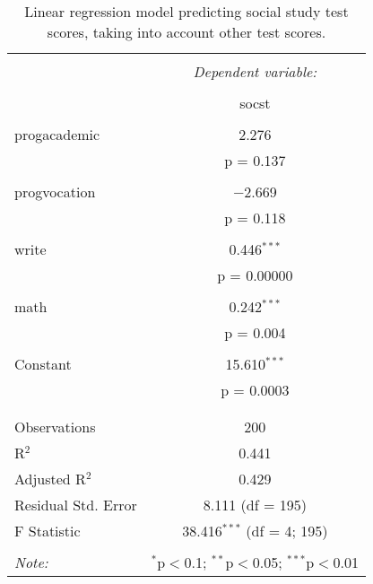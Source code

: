 
\begin{table}[!htbp] \centering 
  \caption{Linear regression model predicting social study test scores, taking into 
          account other test scores.} 
  \label{tab::lm_socst_peeking} 
\begin{tabular}{@{\extracolsep{5pt}}lc} 
\\[-1.8ex]\hline 
\hline \\[-1.8ex] 
 & \multicolumn{1}{c}{\textit{Dependent variable:}} \\ 
\cline{2-2} 
\\[-1.8ex] & socst \\ 
\hline \\[-1.8ex] 
 progacademic & 2.276 \\ 
  & p = 0.137 \\ 
  & \\ 
 progvocation & $-$2.669 \\ 
  & p = 0.118 \\ 
  & \\ 
 write & 0.446$^{***}$ \\ 
  & p = 0.00000 \\ 
  & \\ 
 math & 0.242$^{***}$ \\ 
  & p = 0.004 \\ 
  & \\ 
 Constant & 15.610$^{***}$ \\ 
  & p = 0.0003 \\ 
  & \\ 
\hline \\[-1.8ex] 
Observations & 200 \\ 
R$^{2}$ & 0.441 \\ 
Adjusted R$^{2}$ & 0.429 \\ 
Residual Std. Error & 8.111 (df = 195) \\ 
F Statistic & 38.416$^{***}$ (df = 4; 195) \\ 
\hline 
\hline \\[-1.8ex] 
\textit{Note:}  & \multicolumn{1}{r}{$^{*}$p$<$0.1; $^{**}$p$<$0.05; $^{***}$p$<$0.01} \\ 
\end{tabular} 
\end{table} 

